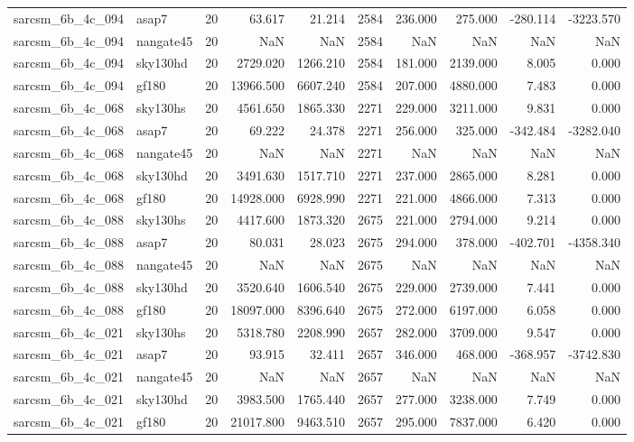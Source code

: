 \begin{tabular}{llrrrrrrrr}
sarcsm\_6b\_4c\_094 & asap7 & 20 & 63.617 & 21.214 & 2584 & 236.000 & 275.000 & -280.114 & -3223.570 \\
sarcsm\_6b\_4c\_094 & nangate45 & 20 & NaN & NaN & 2584 & NaN & NaN & NaN & NaN \\
sarcsm\_6b\_4c\_094 & sky130hd & 20 & 2729.020 & 1266.210 & 2584 & 181.000 & 2139.000 & 8.005 & 0.000 \\
sarcsm\_6b\_4c\_094 & gf180 & 20 & 13966.500 & 6607.240 & 2584 & 207.000 & 4880.000 & 7.483 & 0.000 \\
sarcsm\_6b\_4c\_068 & sky130hs & 20 & 4561.650 & 1865.330 & 2271 & 229.000 & 3211.000 & 9.831 & 0.000 \\
sarcsm\_6b\_4c\_068 & asap7 & 20 & 69.222 & 24.378 & 2271 & 256.000 & 325.000 & -342.484 & -3282.040 \\
sarcsm\_6b\_4c\_068 & nangate45 & 20 & NaN & NaN & 2271 & NaN & NaN & NaN & NaN \\
sarcsm\_6b\_4c\_068 & sky130hd & 20 & 3491.630 & 1517.710 & 2271 & 237.000 & 2865.000 & 8.281 & 0.000 \\
sarcsm\_6b\_4c\_068 & gf180 & 20 & 14928.000 & 6928.990 & 2271 & 221.000 & 4866.000 & 7.313 & 0.000 \\
sarcsm\_6b\_4c\_088 & sky130hs & 20 & 4417.600 & 1873.320 & 2675 & 221.000 & 2794.000 & 9.214 & 0.000 \\
sarcsm\_6b\_4c\_088 & asap7 & 20 & 80.031 & 28.023 & 2675 & 294.000 & 378.000 & -402.701 & -4358.340 \\
sarcsm\_6b\_4c\_088 & nangate45 & 20 & NaN & NaN & 2675 & NaN & NaN & NaN & NaN \\
sarcsm\_6b\_4c\_088 & sky130hd & 20 & 3520.640 & 1606.540 & 2675 & 229.000 & 2739.000 & 7.441 & 0.000 \\
sarcsm\_6b\_4c\_088 & gf180 & 20 & 18097.000 & 8396.640 & 2675 & 272.000 & 6197.000 & 6.058 & 0.000 \\
sarcsm\_6b\_4c\_021 & sky130hs & 20 & 5318.780 & 2208.990 & 2657 & 282.000 & 3709.000 & 9.547 & 0.000 \\
sarcsm\_6b\_4c\_021 & asap7 & 20 & 93.915 & 32.411 & 2657 & 346.000 & 468.000 & -368.957 & -3742.830 \\
sarcsm\_6b\_4c\_021 & nangate45 & 20 & NaN & NaN & 2657 & NaN & NaN & NaN & NaN \\
sarcsm\_6b\_4c\_021 & sky130hd & 20 & 3983.500 & 1765.440 & 2657 & 277.000 & 3238.000 & 7.749 & 0.000 \\
sarcsm\_6b\_4c\_021 & gf180 & 20 & 21017.800 & 9463.510 & 2657 & 295.000 & 7837.000 & 6.420 & 0.000 \\

\end{tabular}
